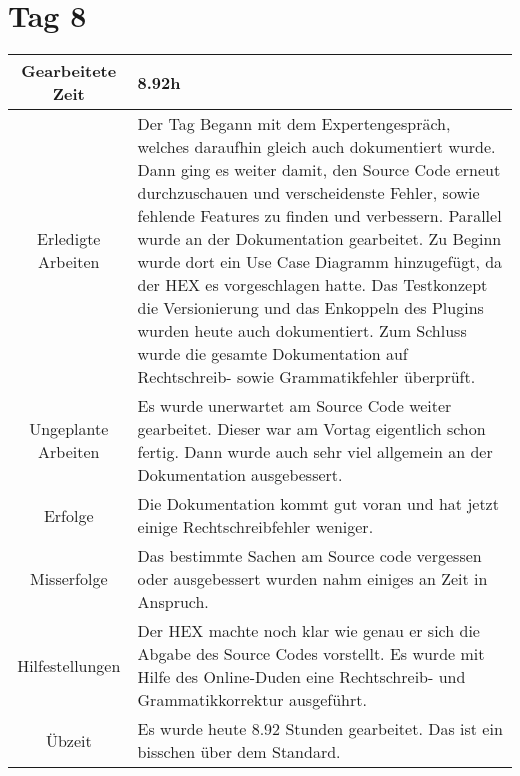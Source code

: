 \section{Tag 8}
\begin{tabularx}{\textwidth}[H]{|c|X|}
  \hline
  Gearbeitete Zeit & 8.92h \\ \hline
  Erledigte Arbeiten & Der Tag Begann mit dem Expertengespräch, welches daraufhin gleich auch dokumentiert wurde. Dann ging
  es weiter damit, den Source Code erneut durchzuschauen und verscheidenste Fehler, sowie fehlende Features zu finden und
  verbessern. \newline
  Parallel wurde an der Dokumentation gearbeitet. Zu Beginn wurde dort ein Use Case Diagramm hinzugefügt, da der HEX es
  vorgeschlagen hatte. Das Testkonzept die Versionierung und das Enkoppeln des Plugins wurden heute auch dokumentiert. 
  Zum Schluss wurde die gesamte Dokumentation auf Rechtschreib- sowie Grammatikfehler überprüft. \\ \hline
  Ungeplante Arbeiten & Es wurde unerwartet am Source Code weiter gearbeitet. Dieser war am Vortag eigentlich schon
  fertig. Dann wurde auch sehr viel allgemein an der Dokumentation ausgebessert. \\ \hline
  Erfolge & Die Dokumentation kommt gut voran und hat jetzt einige Rechtschreibfehler weniger. \\ \hline
  Misserfolge & Das bestimmte Sachen am Source code vergessen oder ausgebessert wurden nahm einiges an Zeit in Anspruch.
  \\ \hline
  Hilfestellungen & Der HEX machte noch klar wie genau er sich die Abgabe des Source Codes vorstellt.
  Es wurde mit Hilfe des Online-Duden eine Rechtschreib- und Grammatikkorrektur ausgeführt. \\ \hline
  Übzeit & Es wurde heute 8.92 Stunden gearbeitet. Das ist ein bisschen über dem Standard. \\ \hline
\end{tabularx}

\newpage

